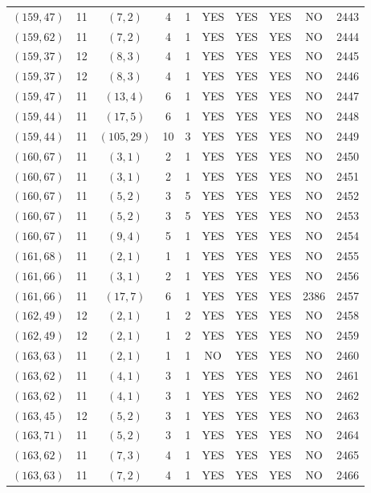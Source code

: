 \begin{longtable}{|c|c|c|c|c|c|c|c|c|c|}
$(159, 47)$ & 11 & $(7, 2)$ & 4 & 1 & YES & YES & YES & NO & 2443\\
$(159, 62)$ & 11 & $(7, 2)$ & 4 & 1 & YES & YES & YES & NO & 2444\\
$(159, 37)$ & 12 & $(8, 3)$ & 4 & 1 & YES & YES & YES & NO & 2445\\
$(159, 37)$ & 12 & $(8, 3)$ & 4 & 1 & YES & YES & YES & NO & 2446\\
$(159, 47)$ & 11 & $(13, 4)$ & 6 & 1 & YES & YES & YES & NO & 2447\\
$(159, 44)$ & 11 & $(17, 5)$ & 6 & 1 & YES & YES & YES & NO & 2448\\
$(159, 44)$ & 11 & $(105, 29)$ & 10 & 3 & YES & YES & YES & NO & 2449\\
$(160, 67)$ & 11 & $(3, 1)$ & 2 & 1 & YES & YES & YES & NO & 2450\\
$(160, 67)$ & 11 & $(3, 1)$ & 2 & 1 & YES & YES & YES & NO & 2451\\
$(160, 67)$ & 11 & $(5, 2)$ & 3 & 5 & YES & YES & YES & NO & 2452\\
$(160, 67)$ & 11 & $(5, 2)$ & 3 & 5 & YES & YES & YES & NO & 2453\\
$(160, 67)$ & 11 & $(9, 4)$ & 5 & 1 & YES & YES & YES & NO & 2454\\
$(161, 68)$ & 11 & $(2, 1)$ & 1 & 1 & YES & YES & YES & NO & 2455\\
$(161, 66)$ & 11 & $(3, 1)$ & 2 & 1 & YES & YES & YES & NO & 2456\\
$(161, 66)$ & 11 & $(17, 7)$ & 6 & 1 & YES & YES & YES & 2386 & 2457\\
$(162, 49)$ & 12 & $(2, 1)$ & 1 & 2 & YES & YES & YES & NO & 2458\\
$(162, 49)$ & 12 & $(2, 1)$ & 1 & 2 & YES & YES & YES & NO & 2459\\
$(163, 63)$ & 11 & $(2, 1)$ & 1 & 1 & NO & YES & YES & NO & 2460\\
$(163, 62)$ & 11 & $(4, 1)$ & 3 & 1 & YES & YES & YES & NO & 2461\\
$(163, 62)$ & 11 & $(4, 1)$ & 3 & 1 & YES & YES & YES & NO & 2462\\
$(163, 45)$ & 12 & $(5, 2)$ & 3 & 1 & YES & YES & YES & NO & 2463\\
$(163, 71)$ & 11 & $(5, 2)$ & 3 & 1 & YES & YES & YES & NO & 2464\\
$(163, 62)$ & 11 & $(7, 3)$ & 4 & 1 & YES & YES & YES & NO & 2465\\
$(163, 63)$ & 11 & $(7, 2)$ & 4 & 1 & YES & YES & YES & NO & 2466\\

\end{longtable}
